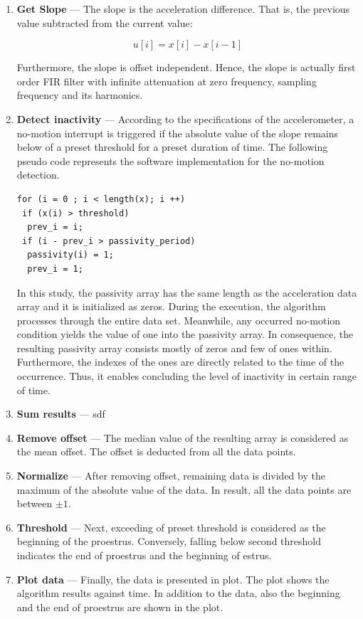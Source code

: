 \documentclass[english,12pt,a4paper,pdftex,elec,utf8]{aaltothesis}
\newcommand{\Clanguage}{\lstset{
  language=C++,                %
  basicstyle=\ttfamily,
  title=\lstname,                 %
}}
\begin{document}
\begin{enumerate}
\item \textbf{Get Slope} --- The slope is the acceleration difference. That is, the previous value subtracted from the current value: 

\begin{equation}
u[i] = x[i] - x[i-1]
\end{equation}

Furthermore, the slope is offset independent. Hence, the slope is actually first order FIR filter with infinite attenuation at zero frequency, sampling frequency and its harmonics. 

\item \textbf{Detect inactivity} --- According to the specifications of the accelerometer, a no-motion interrupt is triggered if the absolute value of the slope remains below of a preset threshold for a preset duration of time. The following pseudo code represents the software implementation for the no-motion detection. 

\Clanguage
\begin{lstlisting}
for (i = 0 ; i < length(x); i ++)
 if (x(i) > threshold)	
  prev_i = i;
 if (i - prev_i > passivity_period)
  passivity(i) = 1;
  prev_i = 1;	
\end{lstlisting}

In this study, the passivity array has the same length as the acceleration data array and it is initialized as zeros. During the execution, the algorithm processes through the entire data set. Meanwhile, any occurred no-motion condition yields the value of one into the passivity array. In consequence, the resulting passivity array consists mostly of zeros and few of ones within. Furthermore, the indexes of the ones are directly related to the time of the occurrence. Thus, it enables concluding the level of inactivity in certain range of time.


\item \textbf{Sum results} --- sdf

\item \textbf{Remove offset} --- The median value of the resulting array is considered as the mean offset. The offset is deducted from all the data points.

\item \textbf{Normalize} --- After removing offset, remaining data is divided by the maximum of the absolute value of the data. In result, all the data points are between $\pm 1$.

\item \textbf{Threshold} --- Next, exceeding of preset threshold is considered as the beginning of the proestrus. Conversely, falling below second threshold indicates the end of proestrus and the beginning of estrus.

\item \textbf{Plot data} --- Finally, the data is presented in plot. The plot shows the algorithm results against time. In addition to the data, also the beginning and the end of proestrus are shown in the plot.


\end{enumerate}
\end{document}
